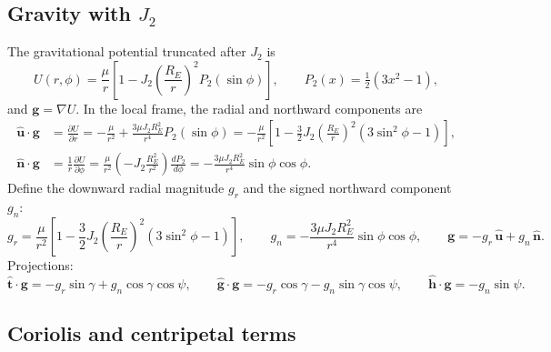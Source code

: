 \documentclass[11pt]{report}
\numberwithin{equation}{chapter}
\newcommand{\uh}{\hat{\mathbf u}}
\newcommand{\nh}{\hat{\mathbf n}}
\newcommand{\tth}{\hat{\mathbf t}}
\newcommand{\gh}{\hat{\mathbf g}}
\newcommand{\hh}{\hat{\mathbf h}}
\newcommand{\vb}[1]{\bm{#1}}
\newcommand{\pd}[2]{\frac{\partial #1}{\partial #2}}
\begin{document}
\subsection{Gravity with $J_2$}

The gravitational potential truncated after $J_2$ is
\begin{equation}
  U(r,\phi) = \frac{\mu}{r}\left[1 - J_2\left(\frac{R_E}{r}\right)^2 P_2(\sin\phi)\right],
  \qquad P_2(x) = \tfrac12\left(3x^2-1\right),
\end{equation}
and $\vb g = \nabla U$. In the local frame, the radial and northward components are
\begin{align}
  \uh\cdot\vb g &= \pd{U}{r}
   = -\frac{\mu}{r^2} + \frac{3\mu J_2 R_E^2}{r^4}P_2(\sin\phi)
   = -\frac{\mu}{r^2}\left[1 - \frac32 J_2\left(\frac{R_E}{r}\right)^2\left(3\sin^2\phi-1\right)\right],\\
  \nh\cdot\vb g &= \frac1r\pd{U}{\phi}
   = \frac{\mu}{r^2}\left(-J_2\frac{R_E^2}{r^2}\right)\frac{d P_2}{d\phi}
   = -\frac{3\mu J_2 R_E^2}{r^4}\sin\phi\cos\phi .
\end{align}
Define the downward radial magnitude $g_r$ and the signed northward component $g_n$:
\begin{equation}
  g_r = \frac{\mu}{r^2}\left[1 - \frac32 J_2\left(\frac{R_E}{r}\right)^2\left(3\sin^2\phi-1\right)\right],
  \qquad
  g_n = -\frac{3\mu J_2 R_E^2}{r^4}\sin\phi\cos\phi,
  \qquad
  \vb g = -g_r\,\uh + g_n\,\nh .
  \label{eq:gravity}
\end{equation}
Projections:
\[
  \tth\cdot\vb g = -g_r\sin\gamma + g_n\cos\gamma\cos\psi,\qquad
  \gh\cdot\vb g = -g_r\cos\gamma - g_n\sin\gamma\cos\psi,\qquad
  \hh\cdot\vb g = -g_n\sin\psi .
\]

\subsection{Coriolis and centripetal terms}
\end{document}
